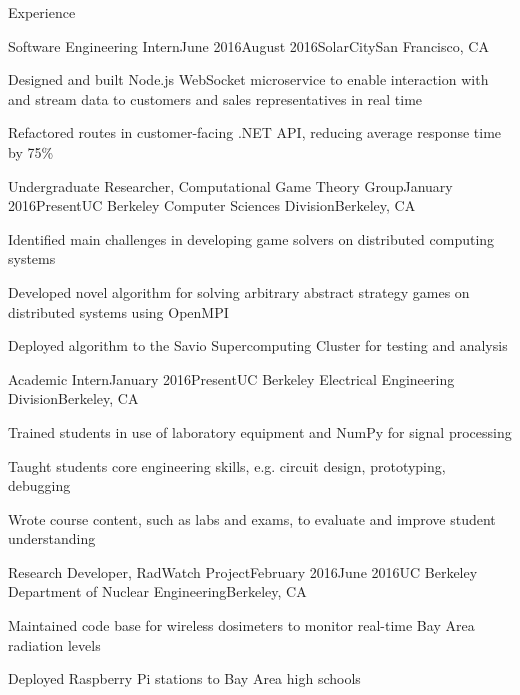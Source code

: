 \documentclass{resume} %
\begin{document}
\begin{rSection}{Experience}
\begin{rSubsection}{Software Engineering Intern}{June 2016\textminus August 2016}{SolarCity}{San Francisco, CA}
\item[] Designed and built Node.js WebSocket microservice to enable interaction with and stream data to customers and sales representatives in real time
\item[] Refactored routes in customer-facing .NET API, reducing average response time by 75\%
\end{rSubsection}
\begin{rSubsection}{Undergraduate Researcher, Computational Game Theory Group}{January 2016\textminus Present}{UC Berkeley Computer Sciences Division}{Berkeley, CA}
\item[] Identified main challenges in developing game solvers on distributed computing systems
\item[] Developed novel algorithm for solving arbitrary abstract strategy games on distributed systems using OpenMPI
\item[] Deployed algorithm to the Savio Supercomputing Cluster for testing and analysis
\end{rSubsection}
\begin{rSubsection}{Academic Intern}{January 2016\textminus Present}{UC Berkeley Electrical Engineering Division}{Berkeley, CA}
\item[] Trained students in use of laboratory equipment and NumPy for signal processing
\item[] Taught students core engineering skills, e.g. circuit design, prototyping, debugging
\item[] Wrote course content, such as labs and exams, to evaluate and improve student understanding
\end{rSubsection}
\begin{rSubsection}{Research Developer, RadWatch Project}{February 2016\textminus June 2016}{UC Berkeley Department of Nuclear Engineering}{Berkeley, CA}
\item[] Maintained code base for wireless dosimeters to monitor real-time Bay Area radiation levels
\item[] Deployed Raspberry Pi stations to Bay Area high schools
\end{rSubsection}
\end{rSection}

\end{document}
